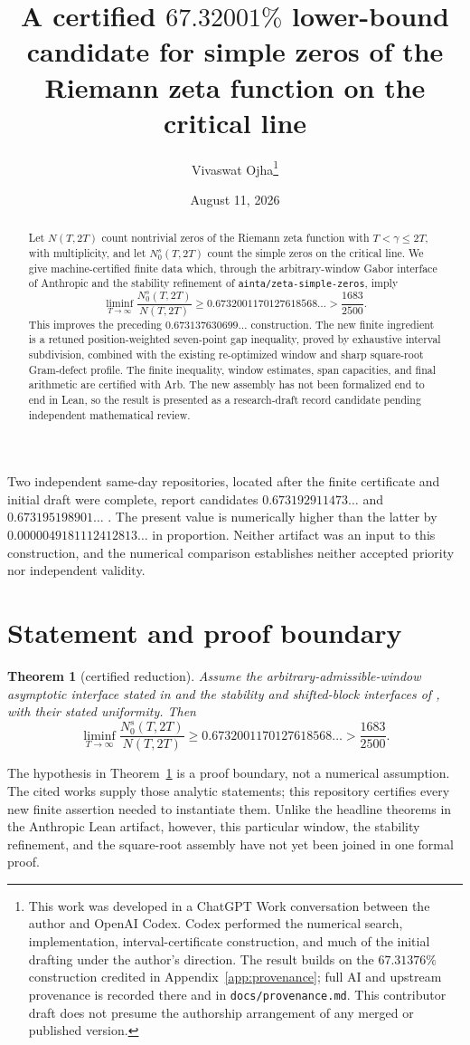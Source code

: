 \documentclass[11pt]{article}
\title{A certified $67.32001\%$ lower-bound candidate for simple zeros of
the Riemann zeta function on the critical line}
\author{Vivaswat Ojha\thanks{This work was developed in a ChatGPT Work
conversation between the author and OpenAI Codex.  Codex performed the
numerical search, implementation, interval-certificate construction, and much
of the initial drafting under the author's direction.  The result builds on
the $67.31376\%$ construction credited in Appendix~\ref{app:provenance}; full
AI and upstream provenance is recorded there and in
\texttt{docs/provenance.md}.  This contributor draft does not presume the
authorship arrangement of any merged or published version.}}
\date{August 11, 2026}
\newtheorem{theorem}{Theorem}
\theoremstyle{remark}
\newcommand{\liminfT}{\liminf_{T\to\infty}}
\begin{document}
\maketitle

\begin{abstract}
Let $N(T,2T)$ count nontrivial zeros of the Riemann zeta function with
$T<\gamma\le 2T$, with multiplicity, and let $N_0^s(T,2T)$ count the simple
zeros on the critical line.  We give machine-certified finite data which,
through the arbitrary-window Gabor interface of Anthropic and the stability
refinement of \texttt{ainta/zeta-simple-zeros}, imply
\[
\liminfT\frac{N_0^s(T,2T)}{N(T,2T)}
\ge 0.6732001170127618568\ldots
>\frac{1683}{2500}.
\]
This improves the preceding $0.673137630699\ldots$ construction.  The new
finite ingredient is a retuned position-weighted seven-point gap inequality,
proved by exhaustive interval subdivision, combined with the existing
re-optimized window and sharp square-root Gram-defect profile.  The finite
inequality, window estimates, span capacities, and final arithmetic are
certified with Arb.  The new assembly has not been formalized end to end in
Lean, so the result is presented as a research-draft record candidate pending
independent mathematical review.
\end{abstract}

Two independent same-day repositories, located after the finite certificate
and initial draft were complete, report candidates
$0.673192911473\ldots$ and $0.673195198901\ldots$
\cite{Tawan2026,Pipitone2026}.  The present value is numerically higher than
the latter by $0.0000049181112412813\ldots$ in proportion.  Neither artifact
was an input to this construction, and the numerical comparison establishes
neither accepted priority nor independent validity.

\section{Statement and proof boundary}

\begin{theorem}[certified reduction]\label{thm:main}
Assume the arbitrary-admissible-window asymptotic interface stated in
\cite[\S7.1]{Claude2026} and the stability and shifted-block interfaces of
\cite{Ainta2026}, with their stated uniformity.  Then
\[
\liminfT\frac{N_0^s(T,2T)}{N(T,2T)}
\ge 0.6732001170127618568\ldots
>\frac{1683}{2500}.
\]
\end{theorem}

The hypothesis in Theorem~\ref{thm:main} is a proof boundary, not a numerical
assumption.  The cited works supply those analytic statements; this
repository certifies every new finite assertion needed to instantiate them.
Unlike the headline theorems in the Anthropic Lean artifact, however, this
particular window, the stability refinement, and the square-root assembly
have not yet been joined in one formal proof.
\end{document}
